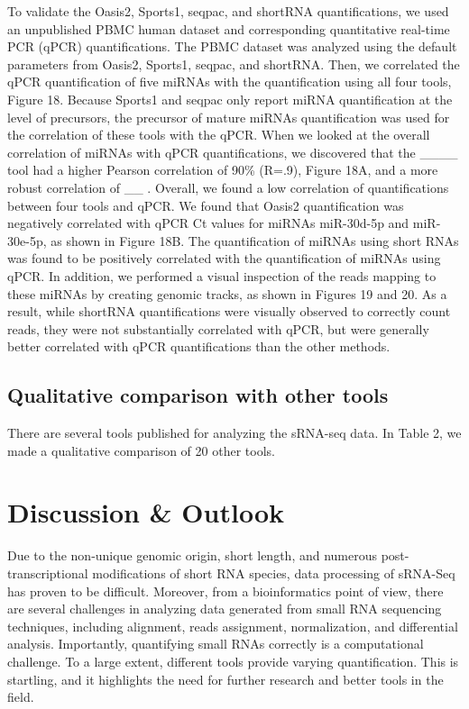 \documentclass[12pt,twoside]{reedthesis}
\begin{document}
To validate the Oasis2, Sports1, seqpac, and shortRNA quantifications,
we used an unpublished PBMC human dataset and corresponding quantitative
real-time PCR (qPCR) quantifications. The PBMC dataset was analyzed
using the default parameters from Oasis2, Sports1, seqpac, and shortRNA.
Then, we correlated the qPCR quantification of five miRNAs with the
quantification using all four tools, Figure 18. Because Sports1 and
seqpac only report miRNA quantification at the level of precursors, the
precursor of mature miRNAs quantification was used for the correlation
of these tools with the qPCR. When we looked at the overall correlation
of miRNAs with qPCR quantifications, we discovered that the \_\_\_\_
tool had a higher Pearson correlation of 90\% (R=.9), Figure 18A, and a
more robust correlation of \_\_ . Overall, we found a low correlation of
quantifications between four tools and qPCR. We found that Oasis2
quantification was negatively correlated with qPCR Ct values for miRNAs
miR-30d-5p and miR-30e-5p, as shown in Figure 18B. The quantification of
miRNAs using short RNAs was found to be positively correlated with the
quantification of miRNAs using qPCR. In addition, we performed a visual
inspection of the reads mapping to these miRNAs by creating genomic
tracks, as shown in Figures 19 and 20. As a result, while shortRNA
quantifications were visually observed to correctly count reads, they
were not substantially correlated with qPCR, but were generally better
correlated with qPCR quantifications than the other methods.

\hypertarget{qualitative-comparison-with-other-tools}{%
\subsection{Qualitative comparison with other tools}\label{qualitative-comparison-with-other-tools}}

There are several tools published for analyzing the sRNA-seq data. In
Table 2, we made a qualitative comparison of 20 other tools.

\hypertarget{discussion-outlook}{%
\section{Discussion \& Outlook}\label{discussion-outlook}}

Due to the non-unique genomic origin, short length, and numerous
post-transcriptional modifications of short RNA species, data processing
of sRNA-Seq has proven to be difficult. Moreover, from a bioinformatics
point of view, there are several challenges in analyzing data generated
from small RNA sequencing techniques, including alignment, reads
assignment, normalization, and differential analysis. Importantly,
quantifying small RNAs correctly is a computational challenge. To a
large extent, different tools provide varying quantification. This is
startling, and it highlights the need for further research and better
tools in the field.
\end{document}
